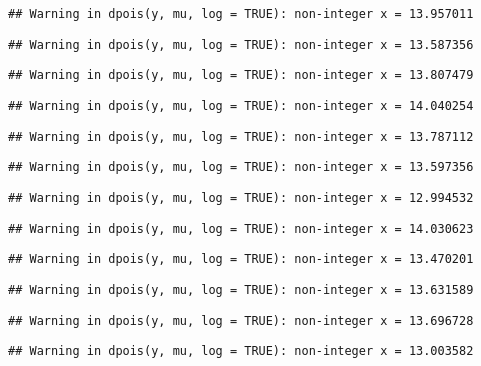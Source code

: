 \documentclass[
]{article}
\begin{document}
\begin{verbatim}
## Warning in dpois(y, mu, log = TRUE): non-integer x = 13.957011
\end{verbatim}

\begin{verbatim}
## Warning in dpois(y, mu, log = TRUE): non-integer x = 13.587356
\end{verbatim}

\begin{verbatim}
## Warning in dpois(y, mu, log = TRUE): non-integer x = 13.807479
\end{verbatim}

\begin{verbatim}
## Warning in dpois(y, mu, log = TRUE): non-integer x = 14.040254
\end{verbatim}

\begin{verbatim}
## Warning in dpois(y, mu, log = TRUE): non-integer x = 13.787112
\end{verbatim}

\begin{verbatim}
## Warning in dpois(y, mu, log = TRUE): non-integer x = 13.597356
\end{verbatim}

\begin{verbatim}
## Warning in dpois(y, mu, log = TRUE): non-integer x = 12.994532
\end{verbatim}

\begin{verbatim}
## Warning in dpois(y, mu, log = TRUE): non-integer x = 14.030623
\end{verbatim}

\begin{verbatim}
## Warning in dpois(y, mu, log = TRUE): non-integer x = 13.470201
\end{verbatim}

\begin{verbatim}
## Warning in dpois(y, mu, log = TRUE): non-integer x = 13.631589
\end{verbatim}

\begin{verbatim}
## Warning in dpois(y, mu, log = TRUE): non-integer x = 13.696728
\end{verbatim}

\begin{verbatim}
## Warning in dpois(y, mu, log = TRUE): non-integer x = 13.003582
\end{verbatim}
\end{document}
